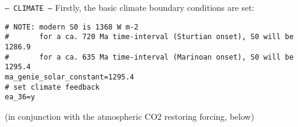 \documentclass[10pt,twoside]{article}
\begin{document}
\begin{compactitem}
        
        \item \texttt{--- CLIMATE ---}
        Firstly, the basic climate boundary conditions are set:
                        \vspace{-5pt}\begin{verbatim}
# NOTE: modern S0 is 1368 W m-2
#       for a ca. 720 Ma time-interval (Sturtian onset), S0 will be 1286.9
#       for a ca. 635 Ma time-interval (Marinoan onset), S0 will be 1295.4
ma_genie_solar_constant=1295.4
# set climate feedback
ea_36=y
                \end{verbatim}\vspace{-5pt}
                (in conjunction with the atmospheric CO2 restoring forcing, below)
                

\end{compactitem}
\end{document}
